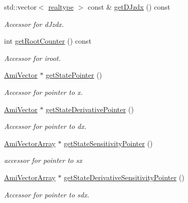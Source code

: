 \begin{DoxyCompactItemize}
std\+::vector$<$ \mbox{\hyperlink{namespaceamici_a1bdce28051d6a53868f7ccbf5f2c14a3}{realtype}} $>$ const  \& \mbox{\hyperlink{classamici_1_1_forward_problem_a3ea9fa40cc5f7ce1f4e1bd0a6db0f785}{get\+D\+Jzdx}} () const
\begin{DoxyCompactList}\small\item\em Accessor for d\+Jzdx. \end{DoxyCompactList}\item 
int \mbox{\hyperlink{classamici_1_1_forward_problem_a9ba8c1d4ef2ba23e6f4faaaefd28aae9}{get\+Root\+Counter}} () const
\begin{DoxyCompactList}\small\item\em Accessor for iroot. \end{DoxyCompactList}\item 
\mbox{\hyperlink{classamici_1_1_ami_vector}{Ami\+Vector}} $\ast$ \mbox{\hyperlink{classamici_1_1_forward_problem_a0efbb7c64b718e9b8b8020acd59afb78}{get\+State\+Pointer}} ()
\begin{DoxyCompactList}\small\item\em Accessor for pointer to x. \end{DoxyCompactList}\item 
\mbox{\hyperlink{classamici_1_1_ami_vector}{Ami\+Vector}} $\ast$ \mbox{\hyperlink{classamici_1_1_forward_problem_a096d23f8405c903ca5d5d4efec5facc0}{get\+State\+Derivative\+Pointer}} ()
\begin{DoxyCompactList}\small\item\em Accessor for pointer to dx. \end{DoxyCompactList}\item 
\mbox{\hyperlink{classamici_1_1_ami_vector_array}{Ami\+Vector\+Array}} $\ast$ \mbox{\hyperlink{classamici_1_1_forward_problem_a5ef9198bc0b08dc9e67efcd5dcf64ced}{get\+State\+Sensitivity\+Pointer}} ()
\begin{DoxyCompactList}\small\item\em accessor for pointer to sx \end{DoxyCompactList}\item 
\mbox{\hyperlink{classamici_1_1_ami_vector_array}{Ami\+Vector\+Array}} $\ast$ \mbox{\hyperlink{classamici_1_1_forward_problem_a440eebbd8bf6a343ff7ee80ddc39b0a0}{get\+State\+Derivative\+Sensitivity\+Pointer}} ()
\begin{DoxyCompactList}\small\item\em Accessor for pointer to sdx. \end{DoxyCompactList}\end{DoxyCompactItemize}
